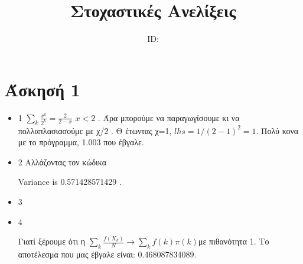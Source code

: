 \documentclass{article}
\title{Στοχαστικές Ανελίξεις\\ \exerciseset}
\author{\studentname \qquad  ID: \suid}
\begin{document}
\maketitle
\section*{Άσκησή 1}
\begin{itemize}
	\item 1
		$\sum_k \frac{x^k}{2^k} = \frac{2}{2-x}$ $x<2$ .
		Άρα μπορούμε να παραγωγίσουμε κι να πολλαπλασιασούμε με χ/2 . 
Θ έτωντας χ=1, $lhs = 1/(2-1)^2=1$. Πολύ κονα με το πρόγραμμα, 1.003 που έβγαλε.
\item 2 
	Αλλάζοντας τον κώδικα  

Variance is  0.571428571429 .
\item 3
\item 4

Γιατί ξέρουμε ότι η $\sum_k \frac{f(X_k)}{N} \rightarrow \sum_k f(k)\pi(k) $με πιθανότητα 1.
Το αποτέλεσμα που μας έβγαλε είναι: 0.468087834089.

\end{itemize}
\end{document}
